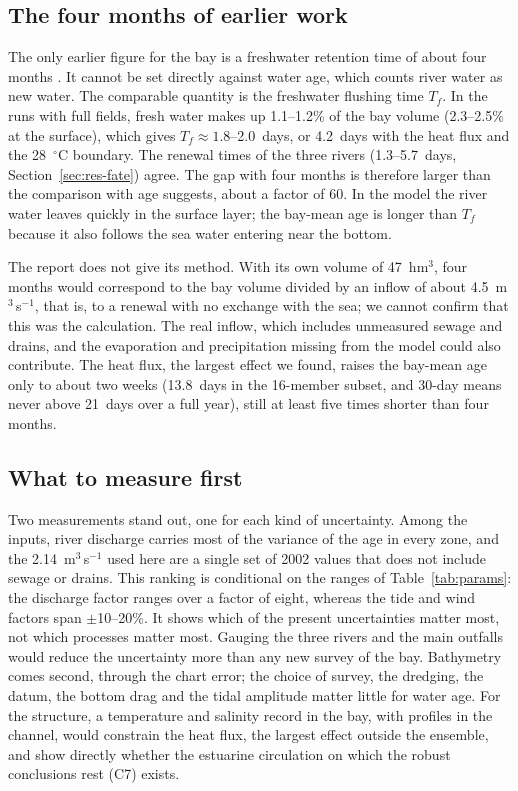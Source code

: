 \documentclass[a4paper,fleqn]{ems-dc}
\begin{document}
\subsection{The four months of earlier work}\label{sec:jica}
The only earlier figure for the bay is a freshwater retention time of about four months
\citep{JICA2004}. It cannot be set directly against water age, which counts river water as
new water. The comparable quantity is the freshwater flushing time $T_f$. In the runs with
full fields, fresh water makes up 1.1--1.2\% of the bay volume (2.3--2.5\% at the surface),
which gives $T_f \approx 1.8$--2.0~days, or 4.2~days with the heat flux and the
28~$^\circ$C boundary. The renewal times of the three rivers (1.3--5.7~days,
Section~\ref{sec:res-fate}) agree. The gap with four months is therefore larger than the
comparison with age suggests, about a factor of 60. In the model the river water leaves
quickly in the surface layer; the bay-mean age is longer than $T_f$ because it also follows
the sea water entering near the bottom.

The report does not give its method. With its own volume of 47~hm$^3$, four months would
correspond to the bay volume divided by an inflow of about 4.5~m$^3$\,s$^{-1}$, that is, to
a renewal with no exchange with the sea; we cannot confirm that this was the calculation.
The real inflow, which includes unmeasured sewage and drains, and the evaporation and
precipitation missing from the model could also contribute. The heat flux, the largest
effect we found, raises the bay-mean age only to about two weeks (13.8~days in the
16-member subset, and 30-day means never above 21~days over a full year), still at least
five times shorter than four months.

\subsection{What to measure first}
Two measurements stand out, one for each kind of uncertainty. Among the inputs, river
discharge carries most of the variance of the age in every zone, and the
2.14~m$^3$\,s$^{-1}$ used here are a single set of 2002 values that does not include sewage
or drains. This ranking is conditional on the ranges of Table~\ref{tab:params}: the
discharge factor ranges over a factor of eight, whereas the tide and wind factors span
$\pm$10--20\%. It shows which of the present uncertainties matter most, not which processes
matter most. Gauging the three rivers and the main outfalls would reduce the uncertainty more
than any new survey of the bay. Bathymetry comes second, through the chart error; the choice
of survey, the dredging, the datum, the bottom drag and the tidal amplitude matter little
for water age. For the structure, a temperature and salinity record in the bay, with
profiles in the channel, would constrain the heat flux, the largest effect outside the
ensemble, and show directly whether the estuarine circulation on which the robust
conclusions rest (C7) exists.
\end{document}
